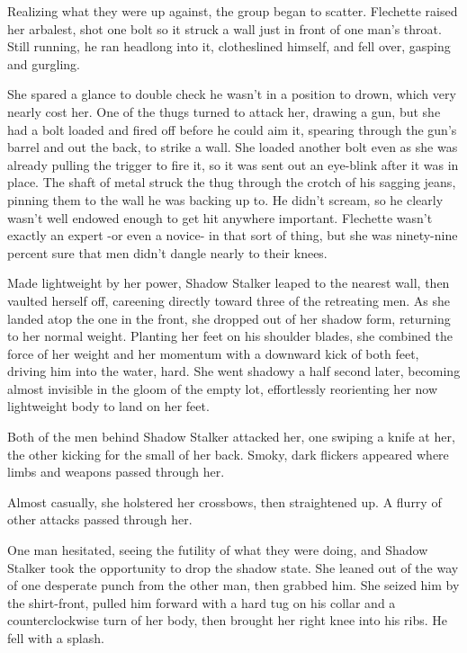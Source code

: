 Realizing what they were up against, the group began to scatter.  Flechette raised her arbalest, shot one bolt so it struck a wall just in front of one man's throat.  Still running, he ran headlong into it, clotheslined himself, and fell over, gasping and gurgling.



She spared a glance to double check he wasn't in a position to drown, which very nearly cost her.  One of the thugs turned to attack her, drawing a gun, but she had a bolt loaded and fired off before he could aim it, spearing through the gun's barrel and out the back, to strike a wall.  She loaded another bolt even as she was already pulling the trigger to fire it, so it was sent out an eye-blink after it was in place.  The shaft of metal struck the thug through the crotch of his sagging jeans, pinning them to the wall he was backing up to.  He didn't scream, so he clearly wasn't well endowed enough to get hit anywhere important.  Flechette wasn't exactly an expert -or even a novice- in that sort of thing, but she was ninety-nine percent sure that men didn't dangle nearly to their knees.



Made lightweight by her power, Shadow Stalker leaped to the nearest wall, then vaulted herself off, careening directly toward three of the retreating men.  As she landed atop the one in the front, she dropped out of her shadow form, returning to her normal weight.  Planting her feet on his shoulder blades, she combined the force of her weight and her momentum with a downward kick of both feet, driving him into the water, hard.  She went shadowy a half second later, becoming almost invisible in the gloom of the empty lot, effortlessly reorienting her now lightweight body to land on her feet.



Both of the men behind Shadow Stalker attacked her, one swiping a knife at her, the other kicking for the small of her back.  Smoky, dark flickers appeared where limbs and weapons passed through her.



Almost casually, she holstered her crossbows, then straightened up.  A flurry of other attacks passed through her.



One man hesitated, seeing the futility of what they were doing, and Shadow Stalker took the opportunity to drop the shadow state.  She leaned out of the way of one desperate punch from the other man, then grabbed him.  She seized him by the shirt-front, pulled him forward with a hard tug on his collar and a counterclockwise turn of her body, then brought her right knee into his ribs.  He fell with a splash.



